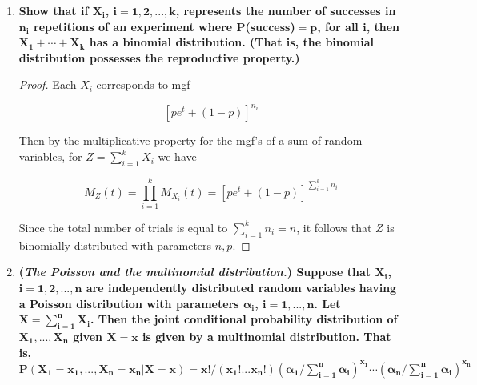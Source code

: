 \documentclass[10pt, oneside]{article}
\begin{document}
\begin{enumerate}[label=10.\arabic*]
Since $X_i$, $i = 1,...,80$ are standard normal and independently and identically distributed, it follows that $S = \sum^{80}_{i=1} X^2_i \sim \chi^2_{80}$. In cases when the degrees of freedom for the chi-squared distribution is high, the following theorem allows us to approximate as a normal distribution:

\begin{thm}
Suppose that the random variable $Y$ has distribution $\chi^2_n$. Then for sufficiently large $n$ the random variable $\sqrt{2Y}$ has approximately the distribution $N(\sqrt{2n-1}, 1)$.
\end{thm}

\begin{align*}
P(S > 77) &= P(\sqrt{2S} > \sqrt{154}) \\
&= P(\sqrt{2S} - \sqrt{159} > \sqrt{154} - \sqrt{159}) \\
&= 1 - \Phi(\sqrt{154} - \sqrt{159}) \\
&= \boxed{0.5793}
\end{align*}

\item  \begin{tcolorbox}[
  colback=Cerulean!5!white,
  colframe=Cerulean!75!black]
\textbf{Show that if $\bm{X_i}$, $\bm{i = 1, 2, ..., k}$, represents the number of successes in $\bm{n_i}$ repetitions of an experiment where $\bm{P}$(success)$\bm{= p}$, for all $\bm{i}$, then $\bm{X_1 + \cdots + X_k}$ has a binomial distribution. (That is, the binomial distribution possesses the reproductive property.)}
\end{tcolorbox}

\begin{proof}
Each $X_i$ corresponds to mgf

\[ [pe^t + (1-p)]^{n_i} \]

Then by the multiplicative property for the mgf's of a sum of random variables, for $Z = \sum^k_{i=1} X_i$ we have

\[ M_Z(t) = \prod^k_{i=1} M_{X_i}(t) = [pe^t + (1-p)]^{\sum^k_{i=1} n_i} \]

Since the total number of trials is equal to $\sum^k_{i=1} n_i = n$, it follows that $Z$ is binomially distributed with parameters $n, p$.
\end{proof}

\item  \begin{tcolorbox}[
  colback=Cerulean!5!white,
  colframe=Cerulean!75!black]
\textbf{(\textit{The Poisson and the multinomial distribution.}) Suppose that $\bm{X_i}$, $\bm{i = 1, 2, ..., n}$ are independently distributed random variables having a Poisson distribution with parameters $\bm{\alpha_i}$, $\bm{i = 1, ..., n}$. Let $\bm{X = \sum^n_{i=1} X_i}$. Then the joint conditional probability distribution of $\bm{X_1, ..., X_n}$ given $\bm{X =x}$ is given by a multinomial distribution. That is, $\bm{P(X_1 = x_1, ..., X_n = x_n | X = x) = x! / (x_1!...x_n!) (\alpha_1 / \sum^n_{i=1} \alpha_i)^{x_1} \cdots (\alpha_n / \sum^n_{i=1} \alpha_i)^{x_n}}$}
\end{tcolorbox}


\end{enumerate}
\end{document}
